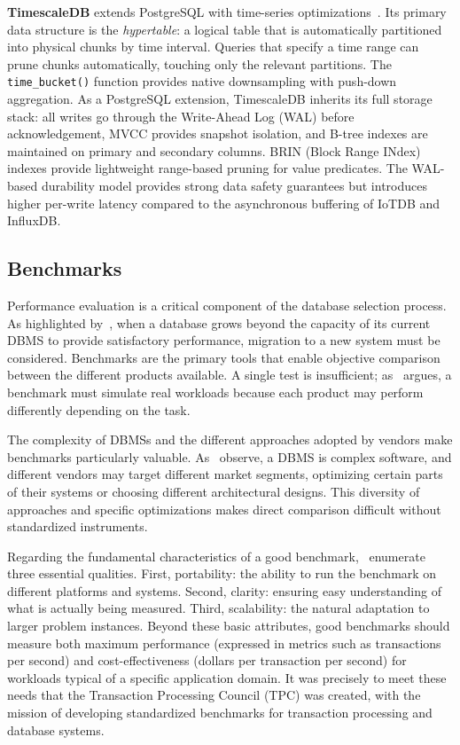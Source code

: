 \textbf{TimescaleDB} extends PostgreSQL with time-series optimizations~\citep{timescaledb}.
Its primary data structure is the \textit{hypertable}: a logical table that is automatically
partitioned into physical chunks by time interval. Queries that specify a time range
can prune chunks automatically, touching only the relevant partitions. The \texttt{time\_bucket()}
function provides native downsampling with push-down aggregation. As a PostgreSQL extension,
TimescaleDB inherits its full storage stack: all writes go through the Write-Ahead Log (WAL)
before acknowledgement, MVCC provides snapshot isolation, and B-tree indexes are maintained
on primary and secondary columns. BRIN (Block Range INdex) indexes provide lightweight
range-based pruning for value predicates. The WAL-based durability model provides strong
data safety guarantees but introduces higher per-write latency compared to the asynchronous
buffering of IoTDB and InfluxDB.

\subsection{Benchmarks}

Performance evaluation is a critical component of the database selection process.
As highlighted by~\cite{Ramakrishnan2003}, when a database grows beyond the capacity of its
current DBMS to provide satisfactory performance, migration to a new system must be considered.
Benchmarks are the primary tools that enable objective comparison between the different products
available. A single test is insufficient; as~\cite{Silberschatz2020} argues, a benchmark must
simulate real workloads because each product may perform differently depending on the task.

The complexity of DBMSs and the different approaches adopted by vendors make benchmarks
particularly valuable. As~\cite{Ramakrishnan2003} observe, a DBMS is complex software, and
different vendors may target different market segments, optimizing certain parts of their
systems or choosing different architectural designs. This diversity of approaches and
specific optimizations makes direct comparison difficult without standardized instruments.

Regarding the fundamental characteristics of a good benchmark,~\cite{Ramakrishnan2003} enumerate
three essential qualities. First, portability: the ability to run the benchmark on
different platforms and systems. Second, clarity: ensuring easy understanding of what
is actually being measured. Third, scalability: the natural adaptation to larger
problem instances. Beyond these basic attributes, good benchmarks should measure both maximum
performance (expressed in metrics such as transactions per second) and cost-effectiveness
(dollars per transaction per second) for workloads typical of a specific application domain.
It was precisely to meet these needs that the Transaction Processing Council (TPC) was created,
with the mission of developing standardized benchmarks for transaction processing and database systems.

